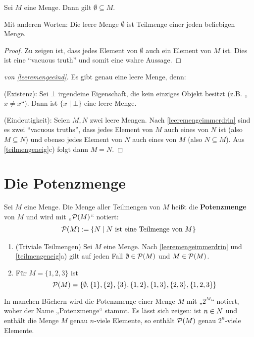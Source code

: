 \begin{satz} \label{leeremengeimmerdrin}
    Sei $M$ eine Menge. Dann gilt $\emptyset\subseteq M$.

    Mit anderen Worten: Die leere Menge $\emptyset$ ist Teilmenge einer jeden beliebigen Menge.
\end{satz}
\begin{proof}
    Zu zeigen ist, dass jedes Element von $\emptyset$ auch ein Element von $M$ ist. Dies ist eine ``vacuous truth'' und somit eine wahre Aussage.
\end{proof}


\begin{proof}[von \cref{leeremengeeind}] \label{bew:leeremengeeind}
    Es gibt genau eine leere Menge, denn:

    (Existenz): Sei $\bot$ irgendeine Eigenschaft, die kein einziges Objekt besitzt (z.B. „$x\neq x$“). Dann ist $\{ x\mid \bot \}$ eine leere Menge.

    (Eindeutigkeit): Seien $M,N$ zwei leere Mengen. Nach \cref{leeremengeimmerdrin} sind es zwei ``vacuous truths'', dass jedes Element von $M$ auch eines von $N$ ist (also $M\subseteq N$) und ebenso jedes Element von $N$ auch eines von $M$ (also $N\subseteq M$). Aus \cref{teilmengeneig}c) folgt dann $M=N$.
\end{proof}





\section{Die Potenzmenge}


\begin{defin}[Potenzmenge] \label{def:potenzmenge} 
    Sei $M$ eine Menge. Die Menge aller Teilmengen von $M$ heißt die \textbf{Potenzmenge} von $M$ und wird mit „$\mathcal P(M)$“ notiert:
    \begin{align*}
        \mathcal P(M) := \{N \mid N \ \text{ist eine Teilmenge von $M$} \}
    \end{align*}
\end{defin}


\begin{bsp} \label{bsp:potenzmenge} \quad
    \begin{enumerate}
        \item(Triviale Teilmengen) Sei $M$ eine Menge. Nach \cref{leeremengeimmerdrin} und \cref{teilmengeneig}a) gilt auf jeden Fall $\emptyset\in \mathcal P(M)$ und $M\in \mathcal P(M)$.
        \item Für $M=\{1,2,3\}$ ist
            \[ \mathcal P(M)=\left\{\emptyset,\{1\},\{2\},\{3\},\{1,2\},\{1,3\},\{2,3\},\{1,2,3\}\right\} \]
    \end{enumerate}
    In manchen Büchern wird die Potenzmenge einer Menge $M$ mit „$2^M$“ notiert, woher der Name „Potenzmenge“ stammt. Es lässt sich zeigen: ist $n\in \relax N$ und enthält die Menge $M$ genau $n$-viele Elemente, so enthält $\mathcal P(M)$ genau $2^n$-viele Elemente.
\end{bsp}


